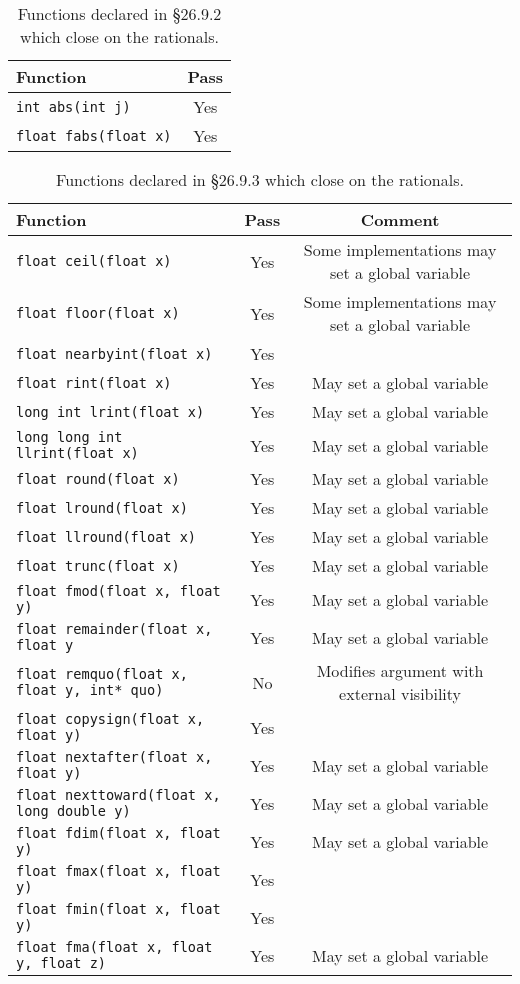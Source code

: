 \documentclass[prd,preprint,amsmath,amssymb,nofootinbib,eqsecnum]{revtex4-1}
\newcommand{\code}[1]{{\tt #1}}
\begin{document}
\begin{table}[h]
	\begin{tabular}{lc}
		Function & Pass
	\\
	\hline \hline
		\code{int abs(int j)} & Yes
	\\
	\hline
		\code{float fabs(float x)} & Yes
	\end{tabular}
\caption{Functions declared in \S 26.9.2 which close on the rationals.}
\label{tab:26.9.2}
\end{table}

\begin{table}[h]
	\begin{tabular}{lcc}
		Function & Pass & Comment
	\\
	\hline \hline
		\code{float ceil(float x)} &  Yes & Some implementations may set a global variable
	\\
	\hline
		\code{float floor(float x)} & Yes & Some implementations may set a global variable
	\\
	\hline
		\code{float nearbyint(float x)} & Yes &
	\\
	\hline
		\code{float rint(float x)} & Yes & May set a global variable
	\\
	\hline
		\code{long int lrint(float x)} &  Yes & May set a global variable
	\\
	\hline
		\code{long long int llrint(float x)} & Yes & May set a global variable 
	\\
	\hline
		\code{float round(float x)} & Yes & May set a global variable
	\\
	\hline
		\code{float lround(float x)} & Yes & May set a global variable
	\\
	\hline
		\code{float llround(float x)} & Yes & May set a global variable
	\\
	\hline
		\code{float trunc(float x)} &  Yes & May set a global variable
	\\
	\hline
		\code{float fmod(float x, float y)} & Yes & May set a global variable
	\\
	\hline
		\code{float remainder(float x, float y} & Yes & May set a global variable
	\\
	\hline
		\code{float remquo(float x, float y, int* quo)} & No & Modifies argument with external visibility
	\\
	\hline
		\code{float copysign(float x, float y)} & Yes &
	\\
	\hline
		\code{float nextafter(float x, float y)} & Yes & May set a global variable
	\\
	\hline
		\code{float nexttoward(float x, long double y)} & Yes & May set a global variable
	\\
	\hline
		\code{float fdim(float x, float y)} & Yes & May set a global variable
	\\
	\hline
		\code{float fmax(float x, float y)} & Yes &
	\\
	\hline
		\code{float fmin(float x, float y)} & Yes &
	\\
	\hline
		\code{float fma(float x, float y, float z)} & Yes & May set a global variable
	\end{tabular}
\caption{Functions declared in \S 26.9.3 which close on the rationals.}
\label{tab:26.9.3}
\end{table}
\end{document}
